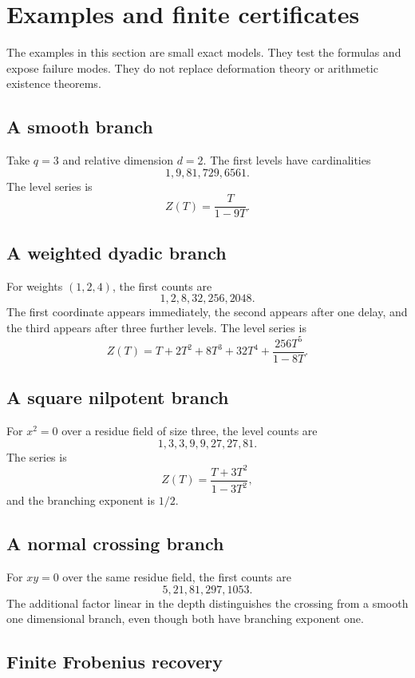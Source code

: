 \documentclass{aomart}
\theoremstyle{definition}
\theoremstyle{remark}
\begin{document}
\section{Examples and finite certificates}\label{sec:examples}

The examples in this section are small exact models. They test the formulas and expose failure modes. They do not replace deformation theory or arithmetic existence theorems.

\subsection{A smooth branch}

Take \(q=3\) and relative dimension \(d=2\). The first levels have cardinalities
\[
1,9,81,729,6561.
\]
The level series is
\[
Z(T)=\frac{T}{1-9T}.
\]

\subsection{A weighted dyadic branch}

For weights \((1,2,4)\), the first counts are
\[
1,2,8,32,256,2048.
\]
The first coordinate appears immediately, the second appears after one delay, and the third appears after three further levels. The level series is
\[
Z(T)
=
T+2T^2+8T^3+32T^4+
\frac{256T^5}{1-8T}.
\]

\subsection{A square nilpotent branch}

For \(x^2=0\) over a residue field of size three, the level counts are
\[
1,3,3,9,9,27,27,81.
\]
The series is
\[
Z(T)=\frac{T+3T^2}{1-3T^2},
\]
and the branching exponent is \(1/2\).

\subsection{A normal crossing branch}

For \(xy=0\) over the same residue field, the first counts are
\[
5,21,81,297,1053.
\]
The additional factor linear in the depth distinguishes the crossing from a smooth one dimensional branch, even though both have branching exponent one.

\subsection{Finite Frobenius recovery}
\end{document}
